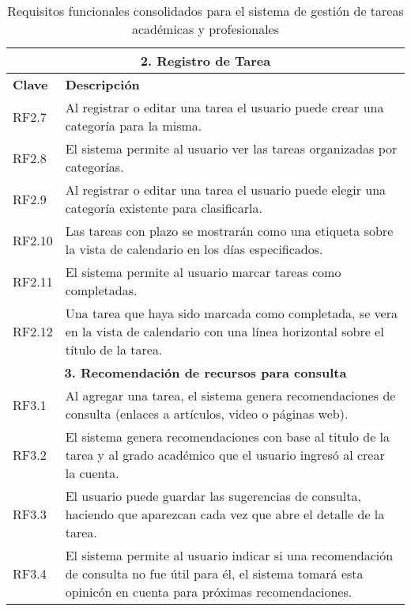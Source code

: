 \documentclass[11pt]{article}
\begin{document}
\begin{table}[H]
    \centering
    \begin{tabular}{|p{2cm}|p{13cm}|}
    \hline
    \multicolumn{2}{|c|}{\textbf{2. Registro de Tarea}} \\
    \hline
    \textbf{Clave} & \textbf{Descripción } \\
    \hline
    RF2.7 & Al registrar o editar una tarea el usuario puede crear una categoría para la misma.\\
    \hline
    RF2.8 & El sistema permite al usuario ver las tareas organizadas por categorías. \\
    \hline
    RF2.9 & Al registrar o editar una tarea el usuario puede elegir una categoría existente para clasificarla.\\
    \hline
    RF2.10 & Las tareas con plazo se mostrarán como una etiqueta sobre la vista de calendario en los días especificados.\\
    \hline
    RF2.11 & El sistema permite al usuario marcar tareas como completadas. \\
    \hline
    RF2.12 & Una tarea que haya sido marcada como completada, se vera en la vista de calendario con una línea horizontal sobre el título de la tarea.\\
    \hline
    \multicolumn{2}{|c|}{\textbf{3. Recomendación de recursos para consulta}} \\
    \hline
    RF3.1 & Al agregar una tarea, el sistema genera recomendaciones de consulta (enlaces a artículos, video o páginas web).  \\
    \hline
    RF3.2 & El sistema genera recomendaciones con base al titulo de la tarea y al grado académico que el usuario ingresó al crear la cuenta.\\   
    \hline
    RF3.3 & El usuario puede guardar las sugerencias de consulta, haciendo que aparezcan cada vez que abre el detalle de la tarea.\\
    \hline
    RF3.4 & El sistema permite al usuario indicar si una recomendación de consulta no fue útil para él, el sistema tomará esta opinicón en
    cuenta para próximas recomendaciones. \\
    \hline
    \end{tabular}
    \caption{Requisitos funcionales consolidados para el sistema de gestión de tareas académicas y profesionales}
    \label{tab:requisitos-funcionales-2}
\end{table}
\pagebreak
\end{document}
